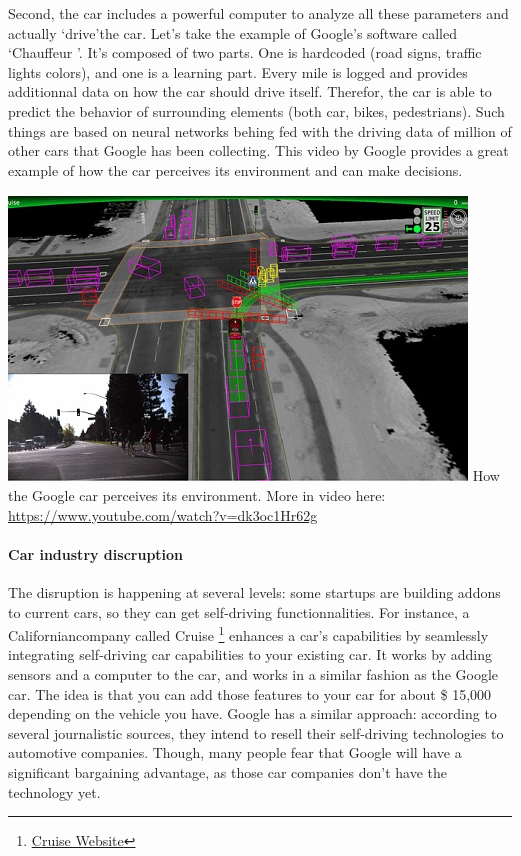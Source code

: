 \documentclass[12pt]{article}
\begin{document}
Second, the car includes a powerful computer to analyze all these parameters
and actually \lq drive\rq the car. Let's take the example of Google's software
called \lq Chauffeur \rq . It's composed of two parts. One is hardcoded
(road signs, traffic lights colors), and one is a learning part. Every mile is
logged and provides additionnal data on how the car should drive itself.
Therefor, the car is able to predict the behavior of surrounding elements
(both car, bikes, pedestrians). Such things are based on neural networks behing
fed with the driving data of million of other cars
that Google has been collecting. This video by Google provides a great example
of how the car perceives its environment and can make decisions.

\smallskip
\includegraphics[width=\textwidth]{google-car}
How the Google car perceives its environment. More in video here: \url{https://www.youtube.com/watch?v=dk3oc1Hr62g}
\smallskip

\paragraph{Car industry discruption}

The disruption is happening at several levels: some startups are building addons
to current cars, so they can get self-driving functionnalities. For instance,
a Californiancompany called Cruise
\footnote{\href{http://www.getcruise.com}{Cruise Website}}
enhances a car's capabilities by seamlessly integrating self-driving car
capabilities to your existing car. It works by adding sensors and a computer to
the car, and works in a similar fashion as the Google car. The idea is that you
can add those features to your car for about \$ 15,000 depending on the vehicle
you have. Google has a similar approach: according to several journalistic
sources, they intend to resell their self-driving technologies to automotive
companies. Though, many people fear that Google will have a significant
bargaining advantage, as those car companies don't have the technology yet.
\end{document}
